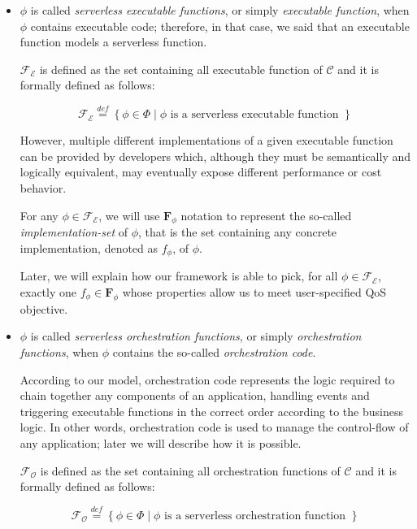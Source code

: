 \documentclass[10pt,a4paper]{report}
\newcommand{\mathDef}{\overset{\textit{def}}{=}}
\theoremstyle{definition}
\begin{document}
\begin{itemize}
	
	\item $\phi$ is called \textit{serverless executable functions}, or simply \textit{executable function}, when $\phi$ contains executable code; therefore, in that case, we said that an executable function models a serverless function.
	
	$\mathscr{F_E}$ is defined as the set containing all executable function of $\mathcal{C}$ and it is formally defined as follows:
	
	\begin{equation}
		\mathscr{F_E} \mathDef \left\lbrace \phi \in \Phi \mid \phi \text{ is a serverless executable function }\right\rbrace 
	\end{equation}
	
	However, multiple different implementations of a given executable function can be provided by developers which, although they must be semantically and logically equivalent, may eventually expose different performance or cost behavior. 
	
	For any $\phi \in \mathscr{F_E}$, we will use $\textbf{F}_{\phi}$ notation to represent the so-called \textit{implementation-set} of $\phi$, that is the set containing any concrete implementation, denoted as $f_{\phi}$, of $\phi$.
	
	Later, we will explain how our framework is able to pick, for all $\phi \in \mathscr{F_E}$, exactly one $f_{\phi} \in \textbf{F}_{\phi}$ whose properties allow us to meet user-specified QoS objective.
	
	\item $\phi$ is called \textit{serverless orchestration functions}, or simply \textit{orchestration functions}, when $\phi$ contains the so-called \textit{orchestration code}. 
	
	According to our model, orchestration code represents the logic required to chain together any components of an application, handling events and triggering executable functions in the correct order according to the business logic. In other words, orchestration code is used to manage the control-flow of any application; later we will describe how it is possible.
	
	$\mathscr{F_O}$ is defined as the set containing all orchestration functions of $\mathcal{C}$ and it is formally defined as follows:
	
	\begin{equation}
		\mathscr{F_O} \mathDef \left\lbrace \phi \in \Phi \mid \phi \text{ is a serverless orchestration function }\right\rbrace 
	\end{equation}
	
\end{itemize}
\end{document}

